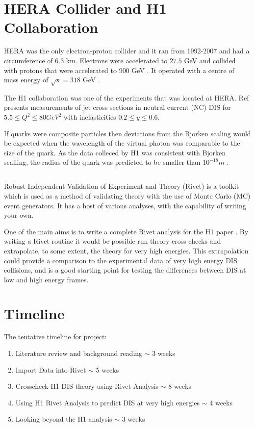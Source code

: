\documentclass[journal, a4paper,11pt]{IEEEtran}
\begin{document}
\section{HERA Collider and H1 Collaboration}

HERA was the only electron-proton collider and it ran from 1992-2007 and had a circumference of 6.3 km. Electrons were accelerated to $27.5$ GeV and collided with protons that were accelerated to $900$ GeV \cite{Modern}. It operated with a centre of mass energy of $\sqrt{s} = 318$ GeV \cite{1308}.

The H1 collaboration \cite{H1} was one of the experiments that was located at HERA. Ref \cite{H1} presents measurements of jet cross sections in neutral current (NC) DIS for $5.5 \leq Q^2 \leq 80 GeV^2$ with inelasticities $0.2 \leq y \leq 0.6$. 

If quarks were composite particles then deviations from the Bjorken scaling would be expected when the wavelength of the virtual photon was comparable to the size of the quark. As the data colleced by H1 was consistent with Bjorken scalling, the radius of the quark was predicted to be smaller than $10^{-18}m$ \cite{Modern}.

\subsection*{}

Robust Independent Validation of Experiment and Theory (Rivet) is a toolkit which is used as a method of validating theory with the use of Monte Carlo (MC) event generators. It has a host of various analyses, with the capability of writing your own. 

One of the main aims is to write a complete Rivet analysis for the H1 paper \cite{H1}. By writing a Rivet routine it would be possible run theory cross checks and extrapolate, to some extent, the theory for very high energies. This extrapolation could provide a comparison to the experimental data of very high energy DIS collisions, and is a good starting point for testing the differences between DIS at low and high energy frames.


\section{Timeline}
The tentative timeline for project:
\begin{enumerate}


\item Literature review and background reading $\sim$ 3 weeks

\item Import Data into Rivet $\sim$ 5 weeks

\item Crosscheck H1 DIS theory using Rivet Analysis $\sim$ 8 weeks

\item Using H1 Rivet Analysis to predict DIS at very high energies $\sim$ 4 weeks 

\item Looking beyond the H1 analysis $\sim$ 3 weeks
\end{enumerate}




\end{document}
